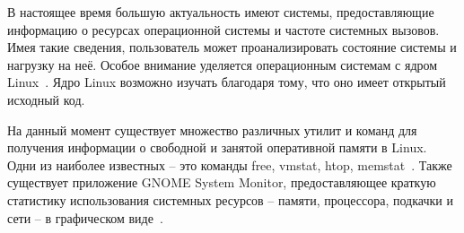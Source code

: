 
В настоящее время большую актуальность имеют системы, предоставляющие информацию о ресурсах операционной системы и частоте системных вызовов. Имея такие сведения, пользователь может проанализировать состояние системы и нагрузку на неё. Особое внимание уделяется операционным системам с ядром Linux~\cite{linux}. Ядро Linux возможно изучать благодаря тому, что оно имеет открытый исходный код.

На данный момент существует множество различных утилит и команд для получения информации о свободной и занятой оперативной памяти в Linux. Одни из наиболее известных -- это команды free, vmstat, htop, memstat~\cite{commands}. Также существует приложение GNOME System Monitor, предоставляющее краткую статистику использования системных ресурсов -- памяти, процессора, подкачки и сети -- в графическом виде~\cite{gnome}.